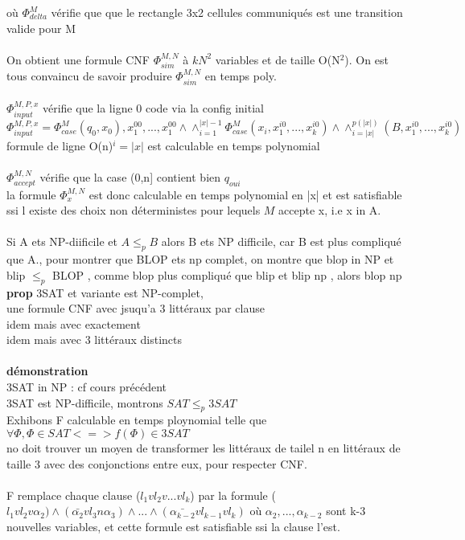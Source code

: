 \documentclass{article}
\begin{document}
  où $\Phi_{delta}^M$ vérifie que que le rectangle 3x2 cellules communiqués est une transition valide pour M\\\\On obtient une formule CNF $\Phi_{sim}^{M,N}$ à $kN^2$ variables et de taille O(N$^2$). On est tous convaincu de savoir produire $\Phi_{sim}^{M,N}$ en temps poly.\\\\
$\Phi_{input}^{M,P,x}$ vérifie que la ligne 0 code via la config initial\\
$\Phi_{input}^{M,P,x} = \Phi_{case}^M(q_0,x_0),x_1^{00},...,x_1^{00} \wedge \wedge_{i=1}^{|x|-1} \Phi_{case}^M(x_i,x_1^{i0},...,x_k^{i0}) \wedge \wedge_{i=|x|}^{p(|x|)} (B,x_1^{i0},...,x_k^{i0})$ formule de ligne O(n)$^i=|x|$ est calculable en temps polynomial\\\\

$\Phi_{accept}^{M,N}$ vérifie que la case (0,n] contient bien $q_{oui}$ \\
la formule $\Phi_x^{M,N}$ est donc calculable en temps polynomial en |x| et est satisfiable ssi l existe des choix non déterministes pour lequels $M$ accepte x, i.e x in A.
\paragraph{} 
Si A ets NP-diificile et $A\leq_p B$ alors B ets NP difficile, car B est plus compliqué que A., pour montrer que BLOP ets np complet, on montre que blop in NP et blip $\leq_p$ BLOP , comme blop plus compliqué que blip et blip np , alors blop np\\\textbf{prop} 3SAT et variante est NP-complet, \\une formule CNF avec jsuqu'a 3 littéraux par clause\\ idem mais avec exactement\\idem mais avec 3 littéraux distincts\\\\\textbf{démonstration} \\3SAT in NP : cf cours précédent\\3SAT est NP-difficile, montrons $SAT \leq_p 3SAT$ \\Exhibons F calculable en temps ploynomial telle que \\$\forall \Phi, \Phi \in SAT <=> f(\Phi) \in 3SAT$\\no doit trouver un moyen de transformer les littéraux de tailel n en littéraux de taille 3 avec des conjonctions entre eux, pour respecter CNF.\\\\F remplace chaque clause ($l_1 v l_2v...vl_k$) par la formule ($l_1vl_2v\alpha_2) \wedge (\bar{\alpha_2}vl_3n\alpha_3)\wedge...\wedge(\bar{\alpha_{k-2}}vl_{k-1}vl_k)$ où $\alpha_2,...,\alpha_{k-2}$ sont k-3 nouvelles variables, et cette formule est satisfiable ssi la clause l'est.
\end{document}

